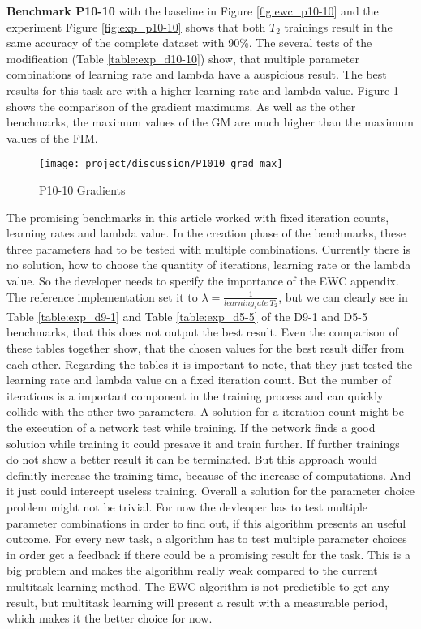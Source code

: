 \textbf{Benchmark P10-10} with the baseline in Figure \ref{fig:ewc_p10-10} and the experiment Figure \ref{fig:exp_p10-10} shows that both $T_2$ trainings result in the same accuracy of the complete dataset with 90\%.
\newline
The several tests of the modification (Table \ref{table:exp_d10-10}) show, that multiple parameter combinations of learning rate and lambda have a auspicious result.
The best results for this task are with a higher learning rate and lambda value.
\newline
Figure \ref{fig:dis_d1010} shows the comparison of the gradient maximums.
As well as the other benchmarks, the maximum values of the GM are much higher than the maximum values of the FIM.

\begin{figure}[H]
    \centering
    \texttt{[image: project/discussion/P1010\_grad\_max]}
    \caption{P10-10 Gradients}
    \label{fig:dis_d1010}
\end{figure}

The promising benchmarks in this article worked with fixed iteration counts, learning rates and lambda value.
In the creation phase of the benchmarks, these three parameters had to be tested with multiple combinations.
Currently there is no solution, how to choose the quantity of iterations, learning rate or the lambda value.
So the developer needs to specify the importance of the EWC appendix.
The reference implementation set it to $\lambda = \frac{1}{learning_rate \: T_2 }$, but we can clearly see in Table \ref{table:exp_d9-1} and Table \ref{table:exp_d5-5} of the D9-1 and D5-5 benchmarks, that this does not output the best result.
Even the comparison of these tables together show, that the chosen values for the best result differ from each other.
Regarding the tables it is important to note, that they just tested the learning rate and lambda value on a fixed iteration count.
But the number of iterations is a important component in the training process and can quickly collide with the other two parameters.
A solution for a iteration count might be the execution of a network test while training.
If the network finds a good solution while training it could presave it and train further.
If further trainings do not show a better result it can be terminated.
But this approach would definitly increase the training time, because of the increase of computations.
And it just could intercept useless training.
Overall a solution for the parameter choice problem might not be trivial.
\newline
For now the devleoper has to test multiple parameter combinations in order to find out, if this algorithm presents an useful outcome.
For every new task, a algorithm has to test multiple parameter choices in order get a feedback if there could be a promising result for the task.
This is a big problem and makes the algorithm really weak compared to the current multitask learning method.
The EWC algorithm is not predictible to get any result, but multitask learning will present a result with a measurable period, which makes it the better choice for now.

